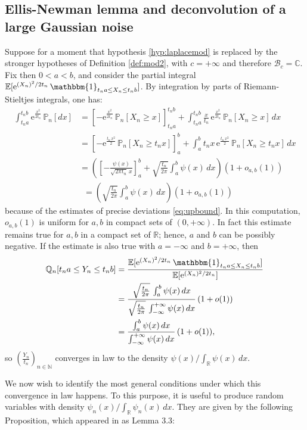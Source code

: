 \documentclass[12pt,a4paper,reqno]{amsart}
\newcommand{\N}{\mathbb{N}}
\newcommand{\R}{\mathbb{R}}
\newcommand{\CC}{\mathbb{C}}
\newcommand{\E}{\mathrm{e}}
\newcommand{\esper}{\mathbb{E}}
\newcommand{\proba}{\mathbb{P}}
\newcommand{\qproba}{\mathbb{Q}}
\theoremstyle{remark}
\begin{document}
\subsection{Ellis-Newman lemma and deconvolution of a large Gaussian noise}
Suppose for a moment that  hypothesis \eqref{hyp:laplacemod} is replaced by the stronger hypotheses of Definition \ref{def:mod2}, with $c=+\infty$ and therefore $\mathcal{B}_c=\CC$. Fix then $0<a<b$, and consider the partial integral $\esper[\E^{(X_n)^2/2t_n}\,\mathbbm{1}_{t_na \leq X_n \leq t_nb}]$. By integration by parts of Riemann-Stieltjes integrals, one has:
\begin{align*}
\int_{t_na}^{t_nb}\E^{\frac{x^2}{2t_n}}\,\proba_n[dx] &= \left[-\E^{\frac{x^2}{2t_n}} \,\proba_n[X_n \geq x]\right]_{t_na}^{t_nb} + \int_{t_na}^{t_nb} \frac{x}{t_n}\,\E^{\frac{x^2}{2t_n}}\,\proba_n[X_n \geq x]\,dx\\
&=\left[-\E^{\frac{t_n\, x^2}{2}} \,\proba_n[X_n \geq t_nx]\right]_{a}^{b} + \int_{a}^{b} t_n x\,\E^{\frac{t_n\,x^2}{2}}\,\proba_n[X_n \geq t_n x]\,dx\\
&= \left(\left[-\frac{\psi(x)}{\sqrt{2\pi t_n}\,x}\right]_a^b +\sqrt{\frac{t_n}{2\pi}} \int_a^b \psi(x)\,dx\right)(1+o_{a,b}(1))\end{align*}
\begin{align*}
&=\left(\sqrt{\frac{t_n}{2\pi}} \int_a^b \psi(x)\,dx\right)(1+o_{a,b}(1))
\end{align*}
because of the estimates of precise deviations \eqref{eq:upbound}. In this computation, $o_{a,b}(1)$ is uniform for $a,b$ in compact sets of $(0,+\infty)$. In fact this estimate remains true for $a,b$ in a compact set of $\R$; hence, $a$ and $b$ can be possibly negative. If the  estimate is also true with $a=-\infty$ and $b=+\infty$, then 
\begin{align*}\qproba_n[t_na \leq Y_n \leq t_nb]&=\frac{\esper[\E^{(X_n)^2/2t_n}\,\mathbbm{1}_{t_na \leq X_n \leq t_nb}]}{\esper[\E^{(X_n)^2/2t_n}]}\\
& = \frac{\sqrt{\frac{t_n}{2\pi}}\,\int_a^b \psi(x)\,dx}{\sqrt{\frac{t_n}{2\pi}}\,\int_{-\infty}^{+\infty} \psi(x)\,dx}\, (1+o(1))\\
&= \frac{\int_a^b \psi(x)\,dx}{\int_{-\infty}^{+\infty} \psi(x)\,dx} \,(1+o(1)),
\end{align*}
so $(\frac{Y_n}{t_n})_{n \in \N}$ converges in law to the density $\psi(x)/\int_{\R}\psi(x)\,dx$.\bigskip

We now wish to identify the most general conditions under which this convergence in law happens. To this purpose, it is useful to produce random variables with density $\psi_n(x)/\int_{\R}\psi_n(x)\,dx$. They are given by the following Proposition, which appeared in \cite{EN78} as Lemma 3.3:
\end{document}
